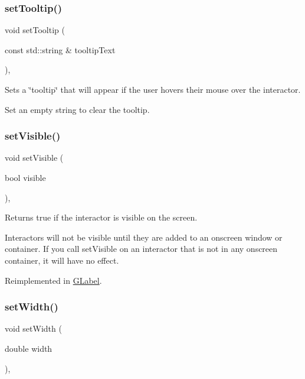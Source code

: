 \subsubsection{\texorpdfstring{set\+Tooltip()}{setTooltip()}}
{\footnotesize\ttfamily void set\+Tooltip (\begin{DoxyParamCaption}\item[{const std\+::string \&}]{tooltip\+Text }\end{DoxyParamCaption})\hspace{0.3cm}{\ttfamily [virtual]}, {\ttfamily [inherited]}}



Sets a \char`\"{}tooltip\char`\"{} that will appear if the user hovers their mouse over the interactor. 

Set an empty string to clear the tooltip. \mbox{\label{classGInteractor_a18e44e30b31525a243960ca3928125aa}} 
\subsubsection{\texorpdfstring{set\+Visible()}{setVisible()}}
{\footnotesize\ttfamily void set\+Visible (\begin{DoxyParamCaption}\item[{bool}]{visible }\end{DoxyParamCaption})\hspace{0.3cm}{\ttfamily [virtual]}, {\ttfamily [inherited]}}



Returns true if the interactor is visible on the screen. 

Interactors will not be visible until they are added to an onscreen window or container. If you call set\+Visible on an interactor that is not in any onscreen container, it will have no effect. 

Reimplemented in \mbox{\hyperlink{classGLabel_afcc2a51afef8e2e61d8d9191386fb93f}{G\+Label}}.

\mbox{\label{classGInteractor_aa3f3fba4cb131baa8696ba01e3bceca1}} 
\subsubsection{\texorpdfstring{set\+Width()}{setWidth()}}
{\footnotesize\ttfamily void set\+Width (\begin{DoxyParamCaption}\item[{double}]{width }\end{DoxyParamCaption})\hspace{0.3cm}{\ttfamily [virtual]}, {\ttfamily [inherited]}}



